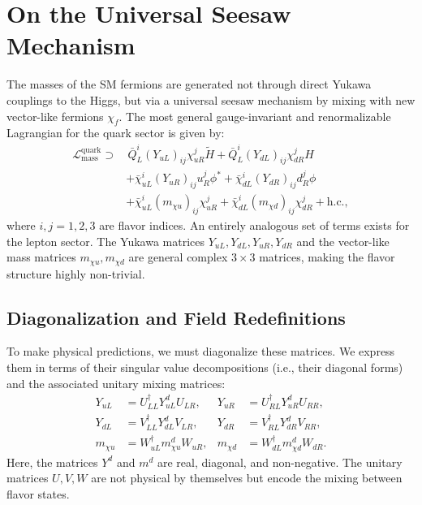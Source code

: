 \chapter{On the Universal Seesaw Mechanism}\label{app:universal_seesaw}

The masses of the SM fermions are generated not through direct Yukawa couplings to the Higgs, but via a universal seesaw mechanism by mixing with new vector-like fermions $\chi_f$. The most general gauge-invariant and renormalizable Lagrangian for the quark sector is given by:
\begin{align}
\mathcal{L}_{\text{mass}}^{\text{quark}} \supset & \, \bar{Q}_{L}^{i} (Y_{u L})_{ij} \chi_{u R}^{j} \tilde{H} + \bar{Q}_{L}^{i} (Y_{d L})_{ij} \chi_{d R}^{j} H \nonumber \\
& + \bar{\chi}_{u L}^{i} (Y_{u R})_{ij} u_{R}^{j} \phi^{*} + \bar{\chi}_{d L}^{i} (Y_{d R})_{ij} d_{R}^{j} \phi \nonumber \\
& + \bar{\chi}_{u L}^{i} (m_{\chi u})_{ij} \chi_{u R}^{j} + \bar{\chi}_{d L}^{i} (m_{\chi d})_{ij} \chi_{d R}^{j} + \text{h.c.}, \label{eq:L_Yuk_general_detail}
\end{align}
where $i, j = 1,2,3$ are flavor indices. An entirely analogous set of terms exists for the lepton sector. The Yukawa matrices $Y_{uL}, Y_{dL}, Y_{uR}, Y_{dR}$ and the vector-like mass matrices $m_{\chi u}, m_{\chi d}$ are general complex $3 \times 3$ matrices, making the flavor structure highly non-trivial.

\section{Diagonalization and Field Redefinitions}
To make physical predictions, we must diagonalize these matrices. We express them in terms of their singular value decompositions (i.e., their diagonal forms) and the associated unitary mixing matrices:
\begin{align*}
Y_{u L} &= U_{L L}^{\dagger} Y_{u L}^{d} U_{L R}, & Y_{u R} &= U_{R L}^{\dagger} Y_{u R}^{d} U_{R R}, \\
Y_{d L} &= V_{L L}^{\dagger} Y_{d L}^{d} V_{L R}, & Y_{d R} &= V_{R L}^{\dagger} Y_{d R}^{d} V_{R R}, \\
m_{\chi u} &= W_{u L}^{\dagger} m_{\chi u}^{d} W_{u R}, & m_{\chi d} &= W_{d L}^{\dagger} m_{\chi d}^{d} W_{d R}.
\end{align*}
Here, the matrices $Y^{d}$ and $m^{d}$ are real, diagonal, and non-negative. The unitary matrices $U, V, W$ are not physical by themselves but encode the mixing between flavor states.

